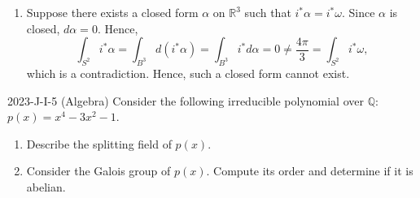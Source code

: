 \documentclass{article}
\begin{document}
\begin{solutions}
\begin{enumerate}[itemsep =-2pt,label = (\alph{*})]
\begin{equation}
			\end{equation}
		From this, we conclude that 
			\begin{equation}
				\int_{S^{2}}i^{\ast}\omega = \int_{0}^{2\pi}\int_{0}^{\pi}\left[\sin^{2}(\varphi)\cos^{2}(\theta) + \sin(\varphi)\cos(\theta) + \sin(\varphi)\sin(\theta)\right]\sin^{2}(\varphi)\cos(\theta)d\varphi d\theta = \frac{4\pi}{3}. 
			\end{equation}
		(\textbf{Method 2}) Using Stokes Theorem, 
			\begin{equation}
				\int_{S^{2}}i^{\ast}\omega = \int_{B^{3}}d\omega, 
			\end{equation}
		where $B^{3}$ indicates the $3$-ball (recall that $S^{1} = \partial B^{3}$). We compute, $d\omega = (2x  + 1)dx \wedge dy \wedge dz$ so that 
			\begin{equation}
				\int_{S^{2}}i^{\ast}\omega = \int_{B^{3}}d\omega = \int_{B^{3}}2xdxdydz + \int_{B^{3}}dxdydz = \int_{B^{3}}dxdydz = \frac{4\pi}{3}, 
			\end{equation}
		where the first integral after the second inequality is zero due to symmetry. 
		\item Suppose there exists a closed form $\alpha$ on $\mathbb{R}^{3}$ such that $i^{\ast}\alpha = i^{\ast}\omega$. Since $\alpha$ is closed, $d\alpha = 0$. Hence, 
			\begin{equation}
				\int_{S^{2}}i^{\ast}\alpha = \int_{B^{3}}d(i^{\ast}\alpha) = \int_{B^{3}}i^{\ast}d\alpha = 0 \neq \frac{4\pi}{3} =\int_{S^{2}}i^{\ast}\omega, 
			\end{equation}
		which is a contradiction. Hence, such a closed form cannot exist. 
	\end{enumerate}
\end{solutions}
\begin{prb}{2023-J-I-5 (Algebra)}
	Consider the following irreducible polynomial over $\mathbb{Q}$: $p(x) = x^{4} - 3x^{2} - 1$. \vspace{-0.25cm}
		\begin{enumerate}[itemsep =-2pt,label = (\alph{*})]
			\item Describe the splitting field of $p(x)$. 
			\item Consider the Galois group of $p(x)$. Compute its order and determine if it is abelian. 
		\end{enumerate}
\end{prb}
\end{document}

